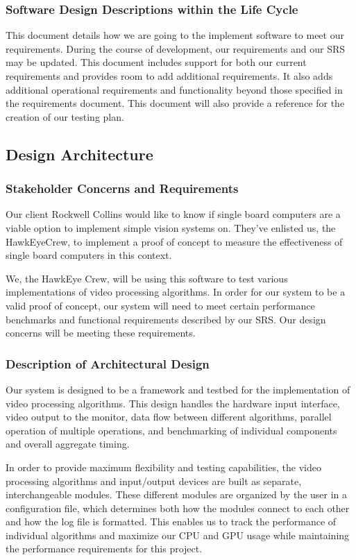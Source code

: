 \subsubsection{Software Design Descriptions within the Life Cycle}
This document details how we are going to the implement software to meet our requirements.
During the course of development, our requirements and our SRS may be updated. This document
includes support for both our current requirements and provides room to add additional requirements.
It also adds additional operational requirements and functionality beyond those specified in the
requirements document. This document will also provide a reference for the creation of our testing plan.

\subsection{Design Architecture}
\subsubsection{Stakeholder Concerns and Requirements}
Our client Rockwell Collins would like to know if single board computers are a viable option to
implement simple vision systems on. They've enlisted us, the HawkEyeCrew, to implement a proof of
concept to measure the effectiveness of single board computers in this context.
\par
We, the HawkEye Crew, will be using this software to test various implementations of video
processing algorithms. In order for our system to be a valid proof of concept, our system will need to
meet certain performance benchmarks and functional requirements described by our SRS. Our design
concerns will be meeting these requirements.\\
\subsubsection{Description of Architectural Design}
Our system is designed to be a framework and testbed for the implementation of video
processing algorithms. This design handles the hardware input interface, video output to the monitor,
data flow between different algorithms, parallel operation of multiple operations, and benchmarking of
individual components and overall aggregate timing.
\par
In order to provide maximum flexibility and testing capabilities, the video processing algorithms and
input/output devices are built as separate, interchangeable modules. These different modules are
organized by the user in a configuration file, which determines both how the modules connect to each
other and how the log file is formatted. This enables us to track the performance of individual
algorithms and maximize our CPU and GPU usage while maintaining the performance requirements for
this project.\\
